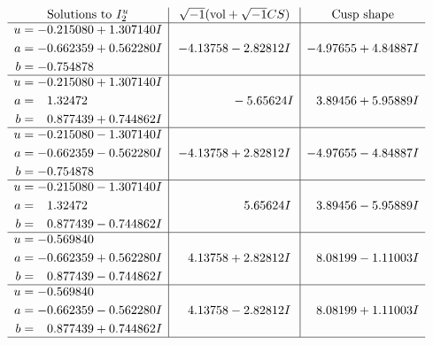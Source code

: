 \documentclass[1p]{elsarticle_modified}
\theoremstyle{definition}
\newcommand{\I}{\sqrt{-1}}
\begin{document}
$$\begin{array}{c|c|c}  
\text{Solutions to }I^u_{2}& \I (\text{vol} + \sqrt{-1}CS) & \text{Cusp shape}\\
 \hline 
\begin{aligned}
u &= -0.215080 + 1.307140 I \\
a &= -0.662359 + 0.562280 I \\
b &= -0.754878\phantom{ +0.000000I}\end{aligned}
 & -4.13758 - 2.82812 I & -4.97655 + 4.84887 I \\ \hline\begin{aligned}
u &= -0.215080 + 1.307140 I \\
a &= \phantom{-}1.32472\phantom{ +0.000000I} \\
b &= \phantom{-}0.877439 + 0.744862 I\end{aligned}
 & \phantom{-0.000000 } -5.65624 I & \phantom{-}3.89456 + 5.95889 I \\ \hline\begin{aligned}
u &= -0.215080 - 1.307140 I \\
a &= -0.662359 - 0.562280 I \\
b &= -0.754878\phantom{ +0.000000I}\end{aligned}
 & -4.13758 + 2.82812 I & -4.97655 - 4.84887 I \\ \hline\begin{aligned}
u &= -0.215080 - 1.307140 I \\
a &= \phantom{-}1.32472\phantom{ +0.000000I} \\
b &= \phantom{-}0.877439 - 0.744862 I\end{aligned}
 & \phantom{-0.000000 -}5.65624 I & \phantom{-}3.89456 - 5.95889 I \\ \hline\begin{aligned}
u &= -0.569840\phantom{ +0.000000I} \\
a &= -0.662359 + 0.562280 I \\
b &= \phantom{-}0.877439 - 0.744862 I\end{aligned}
 & \phantom{-}4.13758 + 2.82812 I & \phantom{-}8.08199 - 1.11003 I \\ \hline\begin{aligned}
u &= -0.569840\phantom{ +0.000000I} \\
a &= -0.662359 - 0.562280 I \\
b &= \phantom{-}0.877439 + 0.744862 I\end{aligned}
 & \phantom{-}4.13758 - 2.82812 I & \phantom{-}8.08199 + 1.11003 I\\
 \hline 
 \end{array}$$\newpage\newpage\renewcommand{\arraystretch}{1}
\end{document}
